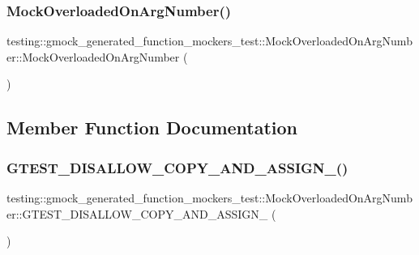 \subsubsection{\texorpdfstring{MockOverloadedOnArgNumber()}{MockOverloadedOnArgNumber()}\hspace{0.1cm}{\footnotesize\ttfamily [3/3]}}
{\footnotesize\ttfamily testing\+::gmock\+\_\+generated\+\_\+function\+\_\+mockers\+\_\+test\+::\+Mock\+Overloaded\+On\+Arg\+Number\+::\+Mock\+Overloaded\+On\+Arg\+Number (\begin{DoxyParamCaption}{ }\end{DoxyParamCaption})\hspace{0.3cm}{\ttfamily [inline]}}



\subsection{Member Function Documentation}
\mbox{\label{classtesting_1_1gmock__generated__function__mockers__test_1_1_mock_overloaded_on_arg_number_aeebad650a232bf9b290647b75975cae5}} 
\subsubsection{\texorpdfstring{GTEST\_DISALLOW\_COPY\_AND\_ASSIGN\_()}{GTEST\_DISALLOW\_COPY\_AND\_ASSIGN\_()}\hspace{0.1cm}{\footnotesize\ttfamily [1/3]}}
{\footnotesize\ttfamily testing\+::gmock\+\_\+generated\+\_\+function\+\_\+mockers\+\_\+test\+::\+Mock\+Overloaded\+On\+Arg\+Number\+::\+G\+T\+E\+S\+T\+\_\+\+D\+I\+S\+A\+L\+L\+O\+W\+\_\+\+C\+O\+P\+Y\+\_\+\+A\+N\+D\+\_\+\+A\+S\+S\+I\+G\+N\+\_\+ (\begin{DoxyParamCaption}\item[{\mbox{\hyperlink{classtesting_1_1gmock__generated__function__mockers__test_1_1_mock_overloaded_on_arg_number}{Mock\+Overloaded\+On\+Arg\+Number}}}]{ }\end{DoxyParamCaption})\hspace{0.3cm}{\ttfamily [private]}}

